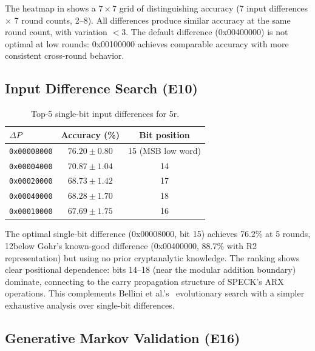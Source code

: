 The heatmap in  shows a $7 \times 7$ grid of distinguishing accuracy (7 input differences $\times$ 7 round counts, 2--8).
All differences produce similar accuracy at the same round count, with variation $<$3\pp.
The default difference (0x00400000) is not optimal at low rounds: 0x00100000 achieves comparable accuracy with more consistent cross-round behavior.

\FloatBarrier
\subsection{Input Difference Search (E10)}

\begin{table}[htbp]
\centering
\caption{Top-5 single-bit input differences for \speck 5r.}
\label{tab:diff-search}
\begin{tabular}{@{}lcc@{}}
\toprule
\textbf{$\Delta P$} & \textbf{Accuracy (\%)} & \textbf{Bit position} \\
\midrule
\texttt{0x00008000} & $76.20 \pm 0.80$ & 15 (MSB low word) \\
\texttt{0x00004000} & $70.87 \pm 1.04$ & 14 \\
\texttt{0x00020000} & $68.73 \pm 1.42$ & 17 \\
\texttt{0x00040000} & $68.28 \pm 1.70$ & 18 \\
\texttt{0x00010000} & $67.69 \pm 1.75$ & 16 \\
\bottomrule
\end{tabular}
\end{table}

The optimal single-bit difference (0x00008000, bit 15) achieves 76.2\% at 5 rounds, 12\pp below Gohr's known-good difference (0x00400000, 88.7\% with R2 representation) but using no prior cryptanalytic knowledge.
The ranking shows clear positional dependence: bits 14--18 (near the modular addition boundary) dominate, connecting to the carry propagation structure of SPECK's ARX operations.
This complements Bellini et al.'s~\citep{bellini2023dbitnet} evolutionary search with a simpler exhaustive analysis over single-bit differences.

\FloatBarrier
\subsection{Generative Markov Validation (E16)}

